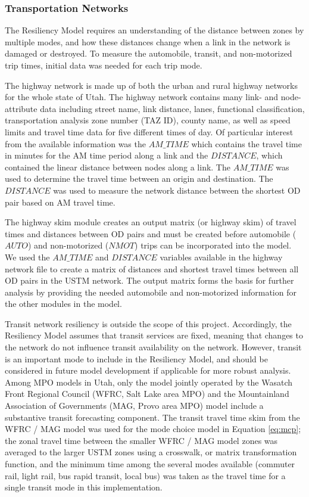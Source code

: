 \subsubsection{Transportation Networks}

The Resiliency Model requires an understanding of the distance between zones by multiple modes, and how
these distances change when a link in the network is damaged or destroyed. To measure the
automobile, transit, and non-motorized trip times, initial data was needed for each trip mode.

The highway network is made up of both the urban and rural highway networks
for the whole state of Utah. The highway network contains many link- and
node-attribute data including street name, link distance, lanes, functional
classification, transportation analysis zone number (TAZ ID), county name,
as well as speed limits and travel time data for five different times of day.
Of particular interest from the available information was the \(AM\_TIME\) which
contains the travel time in minutes for the AM time period along a link and
the \(DISTANCE\), which contained the linear distance between nodes along a link.
The \(AM\_TIME\) was used to determine the travel time between an origin and
destination. The \(DISTANCE\) was used to measure the network distance between
the shortest OD pair based on AM travel time.

The highway skim module creates an output matrix (or highway skim) of travel
times and distances between OD pairs and must be created
before automobile (\(AUTO\)) and non-motorized (\(NMOT\)) trips can be incorporated
into the model. We used the \(AM\_TIME\) and \(DISTANCE\) variables available in
the highway network file to create a matrix of distances and shortest travel
times between all OD pairs in the USTM network. The output matrix forms the
basis for further analysis by providing the needed automobile and non-motorized
information for the other modules in the model.

Transit network resiliency is outside the scope of this project. Accordingly, the Resiliency
Model assumes that transit services are fixed, meaning that changes to the
network do not influence transit availability on the network. However, transit
is an important mode to include in the Resiliency Model, and  should be
considered in future model development if applicable for more robust analysis.
Among MPO models in Utah, only the model jointly operated by the
Wasatch Front Regional Council (WFRC, Salt Lake area MPO) and the
Mountainland Association of Governments (MAG, Provo area MPO) model include a
substantive transit forecasting component. The transit travel time skim from the
WFRC / MAG model was used for the mode choice model in Equation \eqref{eq:mcp};
the zonal travel time between the smaller WFRC / MAG model zones was averaged
to the larger USTM zones using a crosswalk, or matrix transformation function, and the minimum time among the several modes available
(commuter rail, light rail, bus rapid transit, local bus) was taken as the travel
time for a single transit mode in this implementation.

